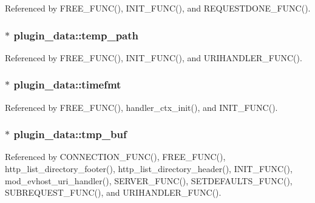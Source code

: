 Referenced by F\-R\-E\-E\-\_\-\-F\-U\-N\-C(), I\-N\-I\-T\-\_\-\-F\-U\-N\-C(), and R\-E\-Q\-U\-E\-S\-T\-D\-O\-N\-E\-\_\-\-F\-U\-N\-C().

\hypertarget{structplugin__data_a788f5bfe6afb819a1b03e035d6d15640}{
\subsubsection[{temp\-\_\-path}]{$\ast$ plugin\-\_\-data\-::temp\-\_\-path}}\label{structplugin__data_a788f5bfe6afb819a1b03e035d6d15640}


Referenced by F\-R\-E\-E\-\_\-\-F\-U\-N\-C(), I\-N\-I\-T\-\_\-\-F\-U\-N\-C(), and U\-R\-I\-H\-A\-N\-D\-L\-E\-R\-\_\-\-F\-U\-N\-C().

\hypertarget{structplugin__data_a1836a11afd1819127fa73c3665b206e0}{
\subsubsection[{timefmt}]{$\ast$ plugin\-\_\-data\-::timefmt}}\label{structplugin__data_a1836a11afd1819127fa73c3665b206e0}


Referenced by F\-R\-E\-E\-\_\-\-F\-U\-N\-C(), handler\-\_\-ctx\-\_\-init(), and I\-N\-I\-T\-\_\-\-F\-U\-N\-C().

\hypertarget{structplugin__data_af234757da9661c72e6b7a6b0cf8cc88f}{
\subsubsection[{tmp\-\_\-buf}]{ $\ast$ plugin\-\_\-data\-::tmp\-\_\-buf}}\label{structplugin__data_af234757da9661c72e6b7a6b0cf8cc88f}


Referenced by C\-O\-N\-N\-E\-C\-T\-I\-O\-N\-\_\-\-F\-U\-N\-C(), F\-R\-E\-E\-\_\-\-F\-U\-N\-C(), http\-\_\-list\-\_\-directory\-\_\-footer(), http\-\_\-list\-\_\-directory\-\_\-header(), I\-N\-I\-T\-\_\-\-F\-U\-N\-C(), mod\-\_\-evhost\-\_\-uri\-\_\-handler(), S\-E\-R\-V\-E\-R\-\_\-\-F\-U\-N\-C(), S\-E\-T\-D\-E\-F\-A\-U\-L\-T\-S\-\_\-\-F\-U\-N\-C(), S\-U\-B\-R\-E\-Q\-U\-E\-S\-T\-\_\-\-F\-U\-N\-C(), and U\-R\-I\-H\-A\-N\-D\-L\-E\-R\-\_\-\-F\-U\-N\-C().

